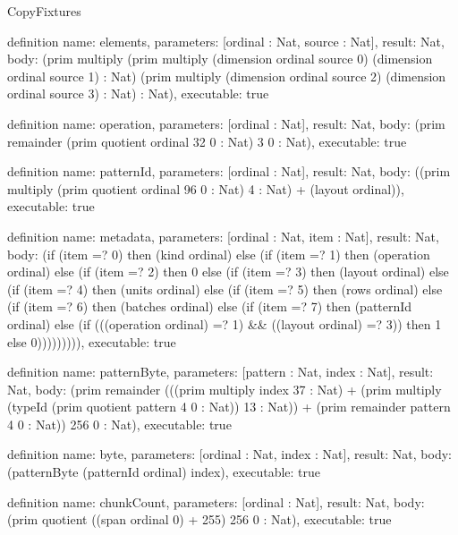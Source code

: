 \begin{lexlean}{CopyFixtures}
\begin{semanticmodule}
definition{
  name: elements,
  parameters: [ordinal : Nat, source : Nat],
  result: Nat,
  body: (prim multiply (prim multiply (dimension ordinal source 0) (dimension ordinal source 1) : Nat) (prim multiply (dimension ordinal source 2) (dimension ordinal source 3) : Nat) : Nat),
  executable: true
}

definition{
  name: operation,
  parameters: [ordinal : Nat],
  result: Nat,
  body: (prim remainder (prim quotient ordinal 32 0 : Nat) 3 0 : Nat),
  executable: true
}

definition{
  name: patternId,
  parameters: [ordinal : Nat],
  result: Nat,
  body: ((prim multiply (prim quotient ordinal 96 0 : Nat) 4 : Nat) + (layout ordinal)),
  executable: true
}

definition{
  name: metadata,
  parameters: [ordinal : Nat, item : Nat],
  result: Nat,
  body: (if (item =? 0) then (kind ordinal) else (if (item =? 1) then (operation ordinal) else (if (item =? 2) then 0 else (if (item =? 3) then (layout ordinal) else (if (item =? 4) then (units ordinal) else (if (item =? 5) then (rows ordinal) else (if (item =? 6) then (batches ordinal) else (if (item =? 7) then (patternId ordinal) else (if (((operation ordinal) =? 1) && ((layout ordinal) =? 3)) then 1 else 0))))))))),
  executable: true
}

definition{
  name: patternByte,
  parameters: [pattern : Nat, index : Nat],
  result: Nat,
  body: (prim remainder (((prim multiply index 37 : Nat) + (prim multiply (typeId (prim quotient pattern 4 0 : Nat)) 13 : Nat)) + (prim remainder pattern 4 0 : Nat)) 256 0 : Nat),
  executable: true
}

definition{
  name: byte,
  parameters: [ordinal : Nat, index : Nat],
  result: Nat,
  body: (patternByte (patternId ordinal) index),
  executable: true
}

definition{
  name: chunkCount,
  parameters: [ordinal : Nat],
  result: Nat,
  body: (prim quotient ((span ordinal 0) + 255) 256 0 : Nat),
  executable: true
}


\end{semanticmodule}
\end{lexlean}
